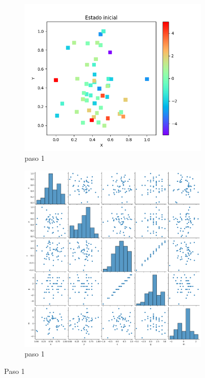 \documentclass{article}
\begin{document}
\begin{figure}[H]
       \centering
       \begin{subfigure}[b]{0.70\linewidth}
           \includegraphics[width=\linewidth]{p9p_t0.png}
           \caption{paso 1}
           \label{f1.a}
        \end{subfigure}
\begin{subfigure}[b]{0.70\linewidth}
           \includegraphics[width=\linewidth]{tiempsop_t001.png}
           \caption{paso 1}
           \label{f1.b}
        \end{subfigure}
\caption{Paso 1}
        \label{f1}
\end{figure}
\end{document}
